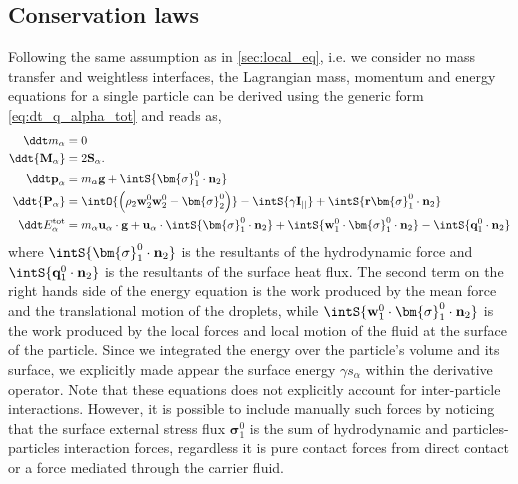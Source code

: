 \subsection{Conservation laws}
Following the same assumption as in \ref{sec:local_eq}, i.e. we consider no mass transfer and weightless interfaces, the Lagrangian  mass, momentum and energy equations for a single particle can be derived using the generic form \ref{eq:dt_q_alpha_tot} and reads as, 
\begin{align}
    \label{eq:dt_m_alpha}
    \ddt m_\alpha
    &= 
    0\\
    \ddt {\textbf{M}_\alpha}
    &=2\textbf{S}_\alpha. 
    \label{eq:dt_M_alpha}
    \\
    \label{eq:dt_p_alpha}
    \ddt \textbf{p}_\alpha
    &= 
    m_\alpha\textbf{g}
    +  \intS{\bm{\sigma}_1^0 \cdot \textbf{n}_2}\\
    \ddt {\textbf{P}_\alpha}
    &= \intO{ \left(
        \rho_2  \textbf{w}_2^0 \textbf{w}_2^0 
        - \bm{\sigma}_2^0
    \right) }
    - \intS{ 
        \gamma \textbf{I}_{||}
    }
    + \intS{ \textbf{r}\bm{\sigma}_1^0\cdot \textbf{n}_2} 
    \label{eq:dt_P_alpha}\\
    \label{eq:dt_E_alpha}
    \ddt E_\alpha^\text{tot}
    &= 
    m_\alpha \textbf{u}_\alpha \cdot \textbf{g}
    +\textbf{u}_\alpha \cdot \intS{\bm{\sigma}_1^0 \cdot \textbf{n}_2}
    +\intS{\textbf{w}_1^0 \cdot \bm{\sigma}_1^0 \cdot  \textbf{n}_2} 
    - \intS{\textbf{q}_1^0 \cdot \textbf{n}_2} \\
\end{align}
where  $\intS{  \bm{\sigma}_1^0 \cdot \textbf{n}_2 }$ is the resultants of the hydrodynamic force and $\intS{ \textbf{q}_1^0 \cdot \textbf{n}_2 }$ is the resultants of the surface heat flux. 
The second term on the right hands side of the energy equation is the work produced by the mean force and the translational motion of the droplets, while $\intS{\textbf{w}_1^0 \cdot \bm{\sigma}_1^0 \cdot  \textbf{n}_2}$ is the work produced by the local forces and local motion of the fluid at the surface of the particle.
Since we integrated the energy over the particle's volume and its surface, we explicitly made appear the surface energy $\gamma s_\alpha$ within the derivative operator. 
Note that these equations does not explicitly account for inter-particle interactions. 
However, it is possible to include manually such forces by noticing that the surface external stress flux $\bm{\sigma}_1^0$ is the sum of hydrodynamic and particles-particles interaction forces, regardless it is pure contact forces from direct contact or a force mediated through the carrier fluid.
